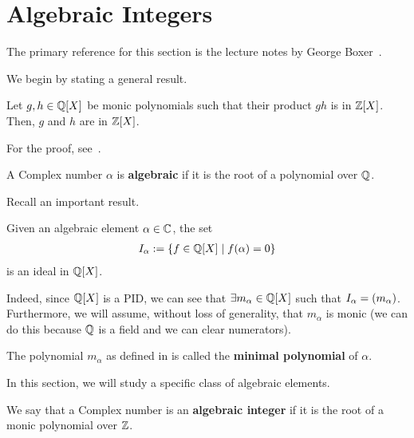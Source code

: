 \section{Algebraic Integers}

The primary reference for this section is the lecture notes by George Boxer~\cite[\S 2]{GeorgeBoxer}.

We begin by stating a general result.

\begin{boxproposition}
    Let $g, h \in \mathbb{Q}[X]$ be monic polynomials such that their product $gh$ is in $\mathbb{Z}[X]$. Then, $g$ and $h$ are in $\mathbb{Z}[X]$.
\end{boxproposition}
For the proof, see~\cite[Lemma 2.2]{GeorgeBoxer}.

\begin{boxdefinition}
    A Complex number $\alpha$ is \textbf{algebraic} if it is the root of a polynomial over $\mathbb{Q}$.
\end{boxdefinition}

Recall an important result.

\begin{boxlemma}\label{Ch1:Lemma:AlgEltEvalIdeal}
    Given an algebraic element $\alpha \in \mathbb{C}$, the set
    \begin{align*}
        I_{\alpha} := \left\{ f \in \mathbb{Q}\!\left[ X \right] \; \middle\vert \; f(\alpha) = 0 \right\}
    \end{align*}
    is an ideal in $\mathbb{Q}\!\left[ X \right]$.
\end{boxlemma}
Indeed, since $\mathbb{Q}\!\left[ X \right]$ is a PID, we can see that $\exists m_{\alpha} \in \mathbb{Q}[X]$ such that $I_{\alpha} = \left( m_{\alpha} \right)$. Furthermore, we will assume, without loss of generality, that $m_{\alpha}$ is monic (we can do this because $\mathbb{Q}$ is a field and we can clear numerators).

\begin{boxdefinition}
    The polynomial $m_{\alpha}$ as defined in  is called the \textbf{minimal polynomial} of $\alpha$.
\end{boxdefinition}

In this section, we will study a specific class of algebraic elements.

\begin{boxdefinition}
    We say that a Complex number is an \textbf{algebraic integer} if it is the root of a monic polynomial over $\mathbb{Z}$.
\end{boxdefinition}

